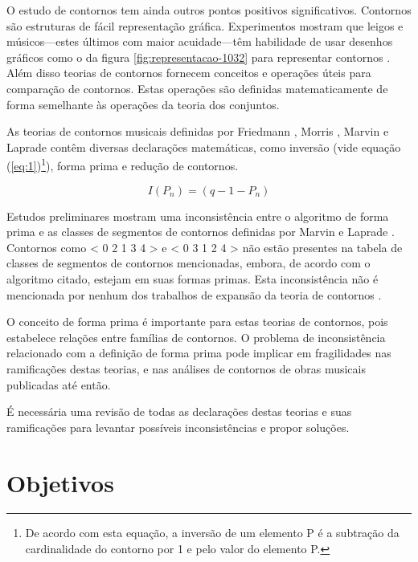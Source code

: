 \documentclass[12pt]{article}
\begin{document}
O estudo de contornos tem ainda outros pontos positivos
significativos. Contornos são estruturas de fácil representação
gráfica. Experimentos mostram que leigos e músicos---estes últimos com
maior acuidade---têm habilidade de usar desenhos gráficos como o da
figura \ref{fig:representacao-1032} para representar contornos
\cite[p. 69]{marvin88:generalized}. Além disso teorias de contornos
fornecem conceitos e operações úteis para comparação de
contornos. Estas operações são definidas matematicamente de forma
semelhante às operações da teoria dos conjuntos.

As teorias de contornos musicais definidas por Friedmann
\cite{friedmann85:methodology}, Morris
\cite{morris87:composition,morris93:directions}, Marvin e Laprade
\cite{marvin.ea87:relating,marvin88:generalized} contêm diversas
declarações matemáticas, como inversão (vide equação
(\ref{eq:1})\footnote{De acordo com esta equação, a inversão de um
  elemento P é a subtração da cardinalidade do contorno por 1 e pelo
  valor do elemento P.}), forma prima e redução de contornos.

\begin{equation}
  \label{eq:1}
  I(P_n) = (q − 1 − P_n)
\end{equation}

Estudos preliminares mostram uma inconsistência entre o algoritmo de
forma prima e as classes de segmentos de contornos definidas por
Marvin e Laprade \cite{marvin.ea87:relating}. Contornos como < 0 2 1 3
4 > e < 0 3 1 2 4 > não estão presentes na tabela de classes de
segmentos de contornos mencionadas, embora, de acordo com o algoritmo
citado, estejam em suas formas primas. Esta inconsistência não é
mencionada por nenhum dos trabalhos de expansão da teoria de contornos
\cite{polansky.ea92:possible,clifford95:contour,quinn97:fuzzy,beard03:contour,bor09:contour,schultz08:melodic,schultz09:diachronic}.

O conceito de forma prima é importante para estas teorias de
contornos, pois estabelece relações entre famílias de contornos. O
problema de inconsistência relacionado com a definição de forma prima
pode implicar em fragilidades nas ramificações destas teorias, e nas
análises de contornos de obras musicais publicadas até então.

É necessária uma revisão de todas as declarações destas teorias e suas
ramificações para levantar possíveis inconsistências e propor soluções.

\section{Objetivos}
\label{sec:objetivos}
\end{document}
